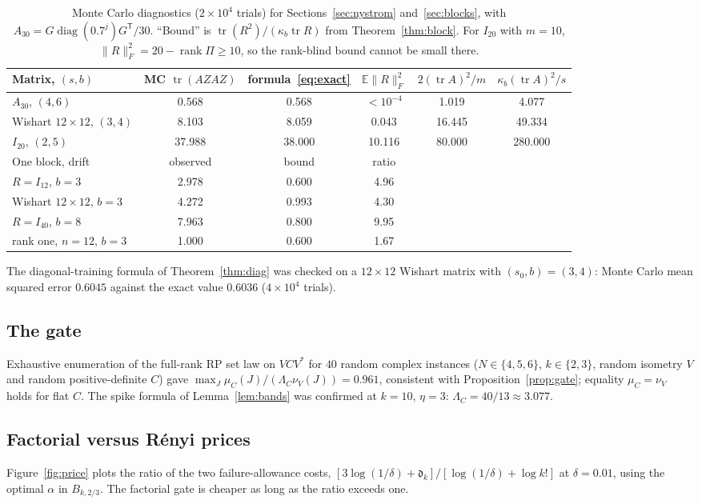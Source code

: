 \documentclass[11pt,a4paper]{article}
\theoremstyle{definition}
\theoremstyle{remark}
\newcommand{\E}{\mathbb E}
\newcommand{\tr}{\operatorname{tr}}
\newcommand{\diag}{\operatorname{diag}}
\newcommand{\rank}{\operatorname{rank}}
\newcommand{\norm}[1]{\lVert#1\rVert}
\newcommand{\1}{\mathbf 1}
\newcommand{\T}{\mathsf T}
\begin{document}
\begin{table}[ht]
\centering\small
\begin{tabular}{lccccc}
\toprule
Matrix, $(s,b)$ & MC $\tr(AZAZ)$ & formula~\eqref{eq:exact} &
$\E\norm R_F^2$ & $2(\tr A)^2/m$ & $\kappa_b(\tr A)^2/s$\\
\midrule
$A_{30}$, $(4,6)$ & 0.568 & 0.568 & $<10^{-4}$ & 1.019 & 4.077\\
Wishart $12\times12$, $(3,4)$ & 8.103 & 8.059 & 0.043 & 16.445 & 49.334\\
$I_{20}$, $(2,5)$ & 37.988 & 38.000 & 10.116 & 80.000 & 280.000\\
\midrule
One block, drift & observed & bound & ratio & &\\
\midrule
$R=I_{12}$, $b=3$ & 2.978 & 0.600 & 4.96 & &\\
Wishart $12\times12$, $b=3$ & 4.272 & 0.993 & 4.30 & &\\
$R=I_{40}$, $b=8$ & 7.963 & 0.800 & 9.95 & &\\
rank one, $n=12$, $b=3$ & 1.000 & 0.600 & 1.67 & &\\
\bottomrule
\end{tabular}
\caption{Monte Carlo diagnostics ($2\times10^4$ trials) for
Sections~\ref{sec:nystrom} and~\ref{sec:blocks}, with
$A_{30}=G\diag(0.7^j)G^\T/30$. ``Bound'' is
$\tr(R^2)/(\kappa_b\tr R)$ from Theorem~\ref{thm:block}. For $I_{20}$
with $m=10$, $\norm R_F^2=20-\rank\Pi\ge10$, so the rank-blind bound
cannot be small there.}
\label{tab:nys}
\end{table}

The diagonal-training formula of Theorem~\ref{thm:diag} was checked on
a $12\times12$ Wishart matrix with $(s_0,b)=(3,4)$: Monte Carlo mean
squared error $0.6045$ against the exact value $0.6036$
($4\times10^4$ trials).

\subsection{The gate}\label{sec:num-gate}
Exhaustive enumeration of the full-rank RP set law on $VCV^*$ for $40$
random complex instances ($N\in\{4,5,6\}$, $k\in\{2,3\}$, random
isometry $V$ and random positive-definite $C$) gave
$\max_J\mu_C(J)/(\Lambda_C\nu_V(J))=0.961$, consistent with
Proposition~\ref{prop:gate}; equality $\mu_C=\nu_V$ holds for flat $C$.
The spike formula of Lemma~\ref{lem:bands} was confirmed at $k=10$,
$\eta=3$: $\Lambda_C=40/13\approx3.077$.

\subsection{Factorial versus R\'enyi prices}\label{sec:num-price}
Figure~\ref{fig:price} plots the ratio of the two failure-allowance
costs, $[3\log(1/\delta)+\mathfrak d_k]/[\log(1/\delta)+\log k!]$ at
$\delta=0.01$, using the optimal $\alpha$ in $B_{k,2/3}$. The factorial
gate is cheaper as long as the ratio exceeds one.
\end{document}
